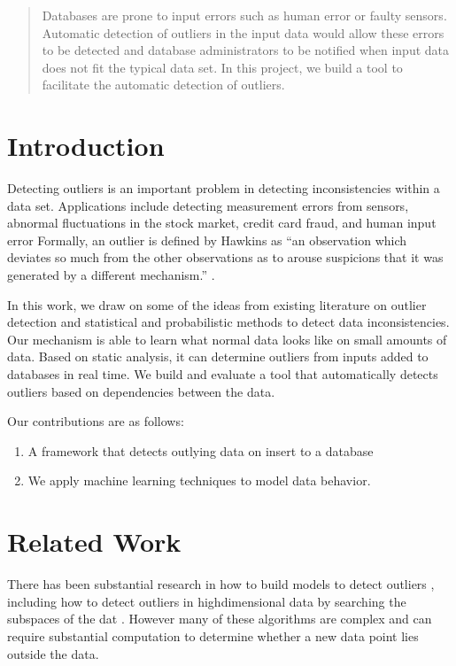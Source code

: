 \documentclass{vldb}
\begin{document}
\maketitle

\begin{abstract}
Databases are prone to input errors such as human error or faulty sensors.
Automatic detection of outliers in the input data would allow these errors to be detected and database administrators to be notified when input data does not fit the typical data set.
In this project, we build a tool to facilitate the automatic detection of outliers.
\end{abstract}




\section{Introduction}
Detecting outliers is an important problem in detecting inconsistencies within a data set.
Applications include detecting measurement errors from sensors, abnormal fluctuations in the stock market, credit card fraud, and human input error
Formally, an outlier is defined by Hawkins as “an observation which deviates so much from the other observations as to arouse suspicions that it was generated by a different mechanism.” \cite{Hawkins1980}.

In this work, we draw on some of the ideas from existing literature on outlier detection and statistical and probabilistic methods to detect data inconsistencies.
Our mechanism is able to learn what normal data looks like on small amounts of data. 
Based on static analysis, it can determine outliers from inputs added to databases in real time.
We build and evaluate a tool that automatically detects outliers based on dependencies between the data.

Our contributions are as follows:
\begin{enumerate}
\item A framework that detects outlying data on insert to a database
\item We apply machine learning techniques to model data behavior.
\end{enumerate}

\section{Related Work}

There has been substantial research in how to build models to detect outliers \cite{Aggarwal2013}, including how to detect outliers in high­dimensional data by searching the subspaces of the dat \cite{Zhang2004}\cite{Kriegel2009}.
However many of these algorithms are complex and can require substantial computation to determine whether a new data point lies outside the data.
\end{document}
